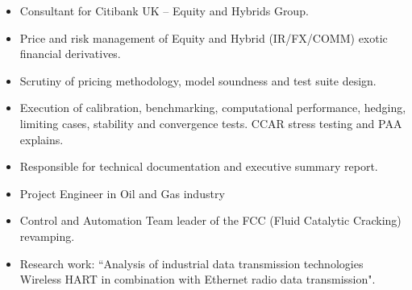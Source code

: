 \documentclass[10pt,a4paper,ragged2e]{altacv}
\begin{document}
\begin{itemize}
\item Consultant for Citibank UK – Equity and Hybrids Group.
\item Price and risk management of Equity and Hybrid (IR/FX/COMM) exotic financial derivatives.
\item Scrutiny of pricing methodology, model soundness and test suite design. 
\item Execution of calibration, benchmarking, computational performance, hedging, limiting cases, 
stability and convergence tests. CCAR stress testing and PAA explains. 
\item Responsible for technical documentation and executive summary report.
\end{itemize}

\divider

\begin{itemize}
\item Project Engineer in Oil and Gas industry
\item Control and Automation Team leader of the FCC (Fluid Catalytic Cracking) revamping. 
\item Research work: “Analysis of industrial data transmission technologies Wireless HART in combination with Ethernet radio data transmission".
\end{itemize}

\divider



\end{document}
